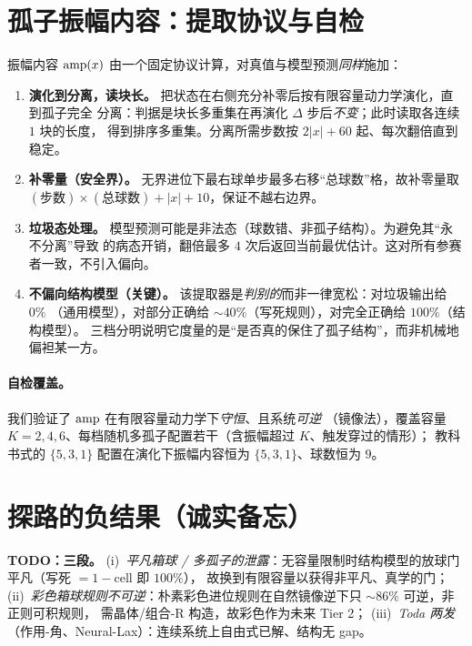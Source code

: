 \documentclass[11pt]{article}
\theoremstyle{definition}
\theoremstyle{plain}
\begin{document}
\section{孤子振幅内容：提取协议与自检}\label{app:metric}
振幅内容 $\mathrm{amp}(x)$ 由一个固定协议计算，对真值与模型预测\emph{同样}施加：

\begin{enumerate}
\item \textbf{演化到分离，读块长。} 把状态在右侧充分补零后按有限容量动力学演化，直到孤子完全
      分离：判据是块长多重集在再演化 $\Delta$ 步后\emph{不变}；此时读取各连续 $1$ 块的长度，
      得到排序多重集。分离所需步数按 $2|x|+60$ 起、每次翻倍直到稳定。
\item \textbf{补零量（安全界）。} 无界进位下最右球单步最多右移“总球数”格，故补零量取
      $(\text{步数})\times(\text{总球数})+|x|+10$，保证不越右边界。
\item \textbf{垃圾态处理。} 模型预测可能是非法态（球数错、非孤子结构）。为避免其“永不分离”导致
      的病态开销，翻倍最多 $4$ 次后返回当前最优估计。这对所有参赛者一致，不引入偏向。
\item \textbf{不偏向结构模型（关键）。} 该提取器是\emph{判别的}而非一律宽松：对垃圾输出给 $0\%$
      （通用模型），对部分正确给 $\sim40\%$（写死规则），对完全正确给 $100\%$（结构模型）。
      三档分明说明它度量的是“是否真的保住了孤子结构”，而非机械地偏袒某一方。
\end{enumerate}

\paragraph{自检覆盖。} 我们验证了 $\mathrm{amp}$ 在有限容量动力学下\emph{守恒}、且系统\emph{可逆}
（镜像法），覆盖容量 $K=2,4,6$、每档随机多孤子配置若干（含振幅超过 $K$、触发穿过的情形）；
教科书式的 $\{5,3,1\}$ 配置在演化下振幅内容恒为 $\{5,3,1\}$、球数恒为 $9$。

\section{探路的负结果（诚实备忘）}\label{app:negatives}
\textbf{TODO：三段。}
(i)~\emph{平凡箱球 / 多孤子的泄露}：无容量限制时结构模型的放球门平凡（写死 $=1-$cell 即 $100\%$），
故换到有限容量以获得非平凡、真学的门；
(ii)~\emph{彩色箱球规则不可逆}：朴素彩色进位规则在自然镜像逆下只 $\sim86\%$ 可逆，非正则可积规则，
需晶体/组合-R 构造，故彩色作为未来 Tier 2；
(iii)~\emph{Toda 两发}（作用-角、Neural-Lax）：连续系统上自由式已解、结构无 gap。



\end{document}
